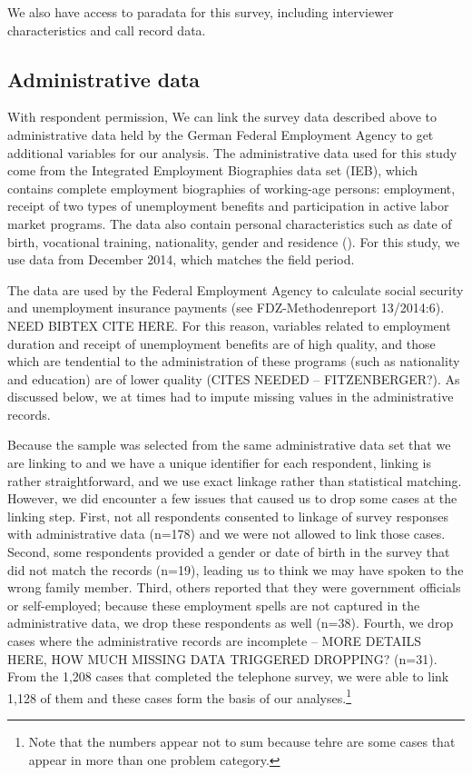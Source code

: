 We also have access to paradata for this survey, including interviewer characteristics and call record data. 

\subsection{Administrative data}\label{admin}
With respondent permission, We can link the survey data described above to administrative data held by the German Federal Employment Agency to get additional variables for our analysis. The administrative data used for this study come from the Integrated Employment Biographies data set (IEB), which contains complete employment biographies of working-age persons: employment, receipt of two types of unemployment benefits and participation in active labor market programs. The data also contain personal characteristics such as date of birth, vocational training, nationality, gender and residence (\cite{Fitzenbergeretal05}). For this study, we use data from December 2014, which matches the field period.

The data are used by the Federal Employment Agency to calculate social security and unemployment insurance payments (see FDZ-Methodenreport 13/2014:6). NEED BIBTEX CITE HERE. For this reason, variables related to employment duration and receipt of unemployment benefits are of high quality, and those which are tendential to the administration of these programs (such as nationality and education) are of lower quality (CITES NEEDED -- FITZENBERGER?). As discussed below, we at times had to impute missing values in the administrative records. 

Because the sample was selected from the same administrative data set that we are linking to and we have a unique identifier for each respondent, linking is rather straightforward, and we use exact linkage rather than statistical matching. However, we did encounter a few issues that caused us to drop some cases at the linking step. First, not all respondents consented to linkage of survey responses with administrative data (n=178) and we were not allowed to link those cases. Second, some respondents provided a gender or date of birth in the survey that did not match the records (n=19), leading us to think we may have spoken to the wrong family member. Third, others reported that they were government officials or self-employed; because these employment spells are not captured in the administrative data, we drop these respondents as well (n=38). Fourth, we drop cases where the administrative records are incomplete -- MORE DETAILS HERE, HOW MUCH MISSING DATA TRIGGERED DROPPING? (n=31). From the 1,208 cases that completed the telephone survey, we were able to link 1,128 of them and these cases form the basis of our analyses.\footnote{Note that the numbers appear not to sum because tehre are some cases that appear in more than one problem category.}


